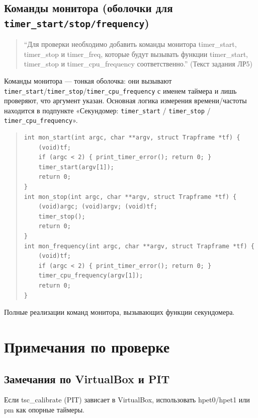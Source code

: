 \documentclass[a4paper,12pt]{article}
\begin{document}
\subsection{Команды монитора (оболочки для \texttt{timer\_start/stop/frequency})}
\begin{quote}
``Для проверки необходимо добавить команды монитора timer_start, timer_stop и timer_freq, которые будут вызывать функции timer_start, timer_stop и timer_cpu_frequency соответственно.'' (Текст задания ЛР5)
\end{quote}
Команды монитора — тонкая оболочка: они вызывают \texttt{timer\_start}/\texttt{timer\_stop}/\texttt{timer\_cpu\_frequency} с именем таймера и лишь проверяют, что аргумент указан. Основная логика измерения времени/частоты находится в подпункте «Секундомер: \texttt{timer\_start} / \texttt{timer\_stop} / \texttt{timer\_cpu\_frequency}».
\begin{quote}\begin{verbatim}
int mon_start(int argc, char **argv, struct Trapframe *tf) {
    (void)tf;
    if (argc < 2) { print_timer_error(); return 0; }
    timer_start(argv[1]);
    return 0;
}
int mon_stop(int argc, char **argv, struct Trapframe *tf) {
    (void)argc; (void)argv; (void)tf;
    timer_stop();
    return 0;
}
int mon_frequency(int argc, char **argv, struct Trapframe *tf) {
    (void)tf;
    if (argc < 2) { print_timer_error(); return 0; }
    timer_cpu_frequency(argv[1]);
    return 0;
}
\end{verbatim}\end{quote}
Полные реализации команд монитора, вызывающих функции секундомера.

\section{Примечания по проверке}
\subsection{Замечания по VirtualBox и PIT}
Если tsc\_calibrate (PIT) зависает в VirtualBox, использовать hpet0/hpet1 или pm как опорные таймеры.
\end{document}
